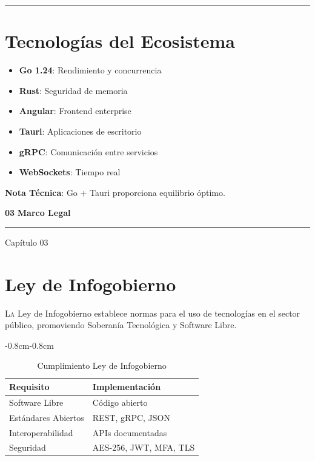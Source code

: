 \documentclass[11pt, spanish, letterpaper, twocolumn, openany]{book}
\newenvironment{tablacompleta}
{\begin{adjustwidth}{-0.8cm}{-0.8cm}}
{\end{adjustwidth}}
\newcommand{\separador}{
    \vspace{1.2ex}
    \begin{center}
        \color{sandraTeal}\rule{0.1\linewidth}{0.8pt}
    \end{center}
    \vspace{1.2ex}
}
\newcommand{\chapterpage}[2]{
\thispagestyle{empty}
\begin{minipage}[c][\textheight][c]{\linewidth}
    \begin{center}
        \vspace{0.2\textheight}
        {\fontsize{120}{130}\selectfont\bfseries\color{sandraDark!8}#1}
        \vspace{-3cm}
        {\fontsize{30}{36}\selectfont\bfseries\color{sandraDark}#2}
        \vspace{0.5cm}
        {\color{sandraTeal}\rule{0.12\linewidth}{2pt}}
        \vspace{0.3cm}
        {\fontsize{11}{13}\selectfont\color{sandraGray}Capítulo #1}
    \end{center}
\end{minipage}
\clearpage
}
\begin{document}
\separador

\section{Tecnologías del Ecosistema}

\begin{itemize}
    \item \textbf{Go 1.24}: Rendimiento y concurrencia
    \item \textbf{Rust}: Seguridad de memoria
    \item \textbf{Angular}: Frontend enterprise
    \item \textbf{Tauri}: Aplicaciones de escritorio
    \item \textbf{gRPC}: Comunicación entre servicios
    \item \textbf{WebSockets}: Tiempo real
\end{itemize}

\begin{notaeditorial}
    \textbf{Nota Técnica}: Go + Tauri proporciona equilibrio óptimo.
\end{notaeditorial}

\clearpage

\chapterpage{03}{Marco Legal}

\section{Ley de Infogobierno}

\lettrine{L}{a} Ley de Infogobierno establece normas para el uso de tecnologías en el sector público, promoviendo Soberanía Tecnológica y Software Libre.

\begin{tablacompleta}
\begin{table}
    \centering
    \small
    \caption{Cumplimiento Ley de Infogobierno}
    \begin{tabular}{lp{7cm}}
        \toprule
        \textbf{Requisito} & \textbf{Implementación} \\
        \midrule
        Software Libre & Código abierto \\
        Estándares Abiertos & REST, gRPC, JSON \\
        Interoperabilidad & APIs documentadas \\
        Seguridad & AES-256, JWT, MFA, TLS \\
        \bottomrule
    \end{tabular}
\end{table}
\end{tablacompleta}
\end{document}
